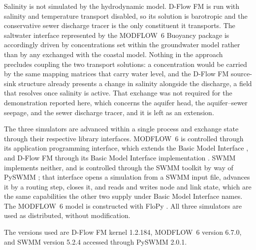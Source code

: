 \documentclass[preprint,authoryear,11pt]{elsarticle}
\begin{document}
Salinity is not simulated by the hydrodynamic model. D-Flow FM is run with salinity and temperature transport disabled, so its solution is barotropic and the conservative sewer discharge tracer is the only constituent it transports. The saltwater interface represented by the MODFLOW~6 Buoyancy package is accordingly driven by concentrations set within the groundwater model rather than by any exchanged with the coastal model. Nothing in the approach precludes coupling the two transport solutions: a concentration would be carried by the same mapping matrices that carry water level, and the D-Flow FM source-sink structure already presents a change in salinity alongside the discharge, a field that resolves once salinity is active. That exchange was not required for the demonstration reported here, which concerns the aquifer head, the aquifer--sewer seepage, and the sewer discharge tracer, and it is left as an extension.

The three simulators are advanced within a single process and exchange state through their respective library interfaces. MODFLOW~6 is controlled through its application programming interface, which extends the Basic Model Interface \citep{hughes2022modflowapi}, and D-Flow FM through its Basic Model Interface implementation \citep{hutton2020bmi}. SWMM implements neither, and is controlled through the SWMM toolkit by way of PySWMM \citep{mcdonnell2020pyswmm}; that interface opens a simulation from a SWMM input file, advances it by a routing step, closes it, and reads and writes node and link state, which are the same capabilities the other two supply under Basic Model Interface names. The MODFLOW~6 model is constructed with FloPy \citep{bakker2016flopy, hughes2023flopy}. All three simulators are used as distributed, without modification.

The versions used are D-Flow FM kernel 1.2.184, MODFLOW~6 version 6.7.0, and SWMM version 5.2.4 accessed through PySWMM 2.0.1.
\end{document}
